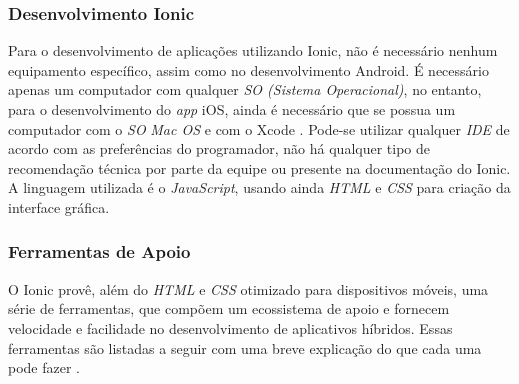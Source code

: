 \subsubsection{Desenvolvimento Ionic} \label{subsubsection:dev-ionic}
Para o desenvolvimento de aplicações utilizando Ionic, não é necessário nenhum equipamento específico, assim como no desenvolvimento Android.
É necessário apenas um computador com qualquer \textit{SO (Sistema Operacional)}, no entanto, para o desenvolvimento do \textit{app} iOS, ainda é necessário que se possua um computador com o \textit{SO} 
\textit{Mac OS} e com o Xcode \cite{drifty_installing_2016}.
Pode-se utilizar qualquer \textit{IDE} de acordo com as preferências do programador, não há qualquer tipo de recomendação técnica por parte da equipe ou presente na documentação do Ionic.
A linguagem utilizada é o \textit{JavaScript}, usando ainda \textit{HTML} e \textit{CSS} para criação da interface gráfica.

\subsubsection{Ferramentas de Apoio} \label{subsection:ionicferramentasapoio}

O Ionic provê, além do \textit{HTML} e \textit{CSS} otimizado para dispositivos móveis, 
uma série de ferramentas, que compõem um ecossistema de apoio e fornecem velocidade e facilidade no desenvolvimento de aplicativos híbridos. 
Essas ferramentas são listadas a seguir com uma breve explicação do que cada uma pode fazer \cite{drifty_ionic:_2016}.

